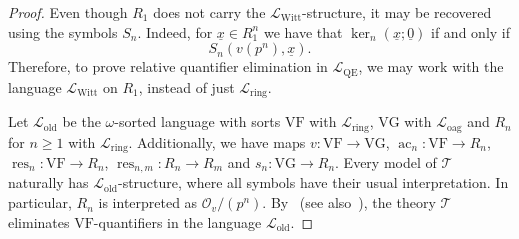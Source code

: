 \documentclass[a4paper]{amsart}
\theoremstyle{mystyle2}
\theoremstyle{mystyle}
\DeclareMathOperator{\res}{res}
\DeclareMathOperator{\ac}{ac}
\renewcommand{\vec}[1]{\underline{#1}}
\newcommand{\cT}{\mathcal{T}}
\renewcommand{\L}{\mathcal{L}}
\newcommand{\Lring}{\L_{\mathrm{ring}}}
\newcommand{\Loag}{\L_{\mathrm{oag}}}
\newcommand{\LWitt}{\L_{\mathrm{Witt}}}
\renewcommand{\O}{\mathcal{O}}
\newcommand{\LQE}{\L_\mathrm{QE}}
\newcommand{\Lold}{\L_\mathrm{old}}
\newcommand{\VF}{\mathrm{VF}}
\newcommand{\VG}{\mathrm{VG}}
\numberwithin{equation}{section}
\begin{document}
    \begin{proof}
        Even though $R_1$ does not carry the $\LWitt$-structure, it may be recovered using the symbols $S_n$.
        Indeed, for $\vec{x}\in R_1^n$ we have that $\ker_n(\vec{x}; \vec{0})$ if and only if 
        \[
            S_n(v(p^n), \vec{x}).
        \]
        Therefore, to prove relative quantifier elimination in $\LQE$, we may work with the language $\LWitt$ on $R_1$, instead of just $\Lring$.
    
        Let $\Lold$ be the $\omega$-sorted language with sorts $\VF$ with $\Lring$, $\VG$ with $\Loag$ and $R_n$ for $n\geq 1$ with $\Lring$.
        Additionally, we have maps $v\colon \VF\to \VG$, $\ac_n\colon \VF\to R_n$, $\res_n\colon \VF\to R_n$, $\res_{n,m}\colon R_n\to R_m$ and $s_n\colon \VG\to R_n$.
        Every model of $\cT$ naturally has $\Lold$-structure, where all symbols have their usual interpretation.
        In particular, $R_n$ is interpreted as $\O_v/(p^n)$.
        By~\cite[Theorem~3.3.10]{rideau2022model} (see also~\cite[Corollary 6.27]{rideau_thesis}), the theory $\cT$ eliminates $\VF$-quantifiers in the language $\Lold$.
        

\end{proof}
\end{document}

